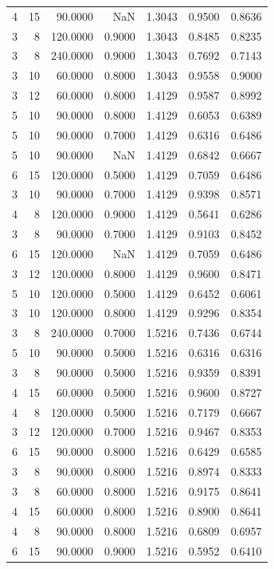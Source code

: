 \begin{tabular}{rrrrrrr}
4 & 15 & 90.0000 & NaN & 1.3043 & 0.9500 & 0.8636 \\
3 & 8 & 120.0000 & 0.9000 & 1.3043 & 0.8485 & 0.8235 \\
3 & 8 & 240.0000 & 0.9000 & 1.3043 & 0.7692 & 0.7143 \\
3 & 10 & 60.0000 & 0.8000 & 1.3043 & 0.9558 & 0.9000 \\
3 & 12 & 60.0000 & 0.8000 & 1.4129 & 0.9587 & 0.8992 \\
5 & 10 & 90.0000 & 0.8000 & 1.4129 & 0.6053 & 0.6389 \\
5 & 10 & 90.0000 & 0.7000 & 1.4129 & 0.6316 & 0.6486 \\
5 & 10 & 90.0000 & NaN & 1.4129 & 0.6842 & 0.6667 \\
6 & 15 & 120.0000 & 0.5000 & 1.4129 & 0.7059 & 0.6486 \\
3 & 10 & 90.0000 & 0.7000 & 1.4129 & 0.9398 & 0.8571 \\
4 & 8 & 120.0000 & 0.9000 & 1.4129 & 0.5641 & 0.6286 \\
3 & 8 & 90.0000 & 0.7000 & 1.4129 & 0.9103 & 0.8452 \\
6 & 15 & 120.0000 & NaN & 1.4129 & 0.7059 & 0.6486 \\
3 & 12 & 120.0000 & 0.8000 & 1.4129 & 0.9600 & 0.8471 \\
5 & 10 & 120.0000 & 0.5000 & 1.4129 & 0.6452 & 0.6061 \\
3 & 10 & 120.0000 & 0.8000 & 1.4129 & 0.9296 & 0.8354 \\
3 & 8 & 240.0000 & 0.7000 & 1.5216 & 0.7436 & 0.6744 \\
5 & 10 & 90.0000 & 0.5000 & 1.5216 & 0.6316 & 0.6316 \\
3 & 8 & 90.0000 & 0.5000 & 1.5216 & 0.9359 & 0.8391 \\
4 & 15 & 60.0000 & 0.5000 & 1.5216 & 0.9600 & 0.8727 \\
4 & 8 & 120.0000 & 0.5000 & 1.5216 & 0.7179 & 0.6667 \\
3 & 12 & 120.0000 & 0.7000 & 1.5216 & 0.9467 & 0.8353 \\
6 & 15 & 90.0000 & 0.8000 & 1.5216 & 0.6429 & 0.6585 \\
3 & 8 & 90.0000 & 0.8000 & 1.5216 & 0.8974 & 0.8333 \\
3 & 8 & 60.0000 & 0.8000 & 1.5216 & 0.9175 & 0.8641 \\
4 & 15 & 60.0000 & 0.8000 & 1.5216 & 0.8900 & 0.8641 \\
4 & 8 & 90.0000 & 0.8000 & 1.5216 & 0.6809 & 0.6957 \\
6 & 15 & 90.0000 & 0.9000 & 1.5216 & 0.5952 & 0.6410 \\

\end{tabular}
